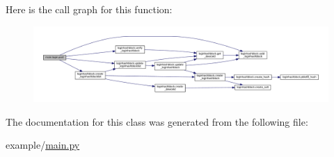 Here is the call graph for this function\+:\nopagebreak
\begin{figure}[H]
\begin{center}
\leavevmode
\includegraphics[width=350pt]{classmain_1_1login_a71ff3f89aaf0f0c8502577445ab38744_cgraph}
\end{center}
\end{figure}




The documentation for this class was generated from the following file\+:\begin{DoxyCompactItemize}
\item 
example/\hyperlink{main_8py}{main.\+py}\end{DoxyCompactItemize}
